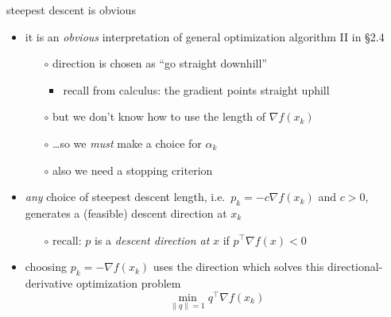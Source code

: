 \documentclass[10pt,hyperref]{beamer}
\newcommand{\grad}{\nabla}
\begin{document}
\begin{frame}{steepest descent is obvious}

\begin{itemize}
\item it is an \emph{obvious} interpretation of general optimization algorithm II in \S 2.4
    \begin{itemize}
    \item[$\circ$] direction is chosen as ``go straight downhill''
        \begin{itemize}
        \item recall from calculus: the gradient points straight uphill
        \end{itemize}
    \item[$\circ$] but we don't know how to use the length of $\grad f(x_k)$
    \item[$\circ$] \dots so we \emph{must} make a choice for $\alpha_k$
    \item[$\circ$] also we need a stopping criterion
    \end{itemize}

\medskip
\item \emph{any} choice of steepest descent length, i.e.~$p_k = - c \grad f(x_k)$ and $c>0$, generates a (feasible) descent direction at $x_k$
    \begin{itemize}
    \item[$\circ$] recall: $p$ is a \emph{descent direction at} $x$ if $p^\top \grad f(x)<0$
    \end{itemize}

\medskip
\item choosing $p_k = - \grad f(x_k)$ uses the direction which solves this directional-derivative optimization problem
    $$\min_{\|q\|=1} q^\top \grad f(x_k)$$
\end{itemize}
\end{frame}
\end{document}
